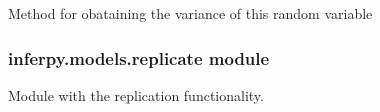 \documentclass[letterpaper,10pt,english]{sphinxmanual}
\begin{document}
\begin{fulllineitems}
\begin{fulllineitems}
\end{fulllineitems}


\begin{fulllineitems}
\label{\detokenize{modules/inferpy.models:inferpy.models.random_variable.RandomVariable.variance}}
Method for obataining the variance of this random variable

\end{fulllineitems}


\end{fulllineitems}



\subsubsection{inferpy.models.replicate module}
\label{\detokenize{modules/inferpy.models:inferpy-models-replicate-module}}\label{\detokenize{modules/inferpy.models:module-inferpy.models.replicate}}
Module with the replication functionality.
\end{document}
